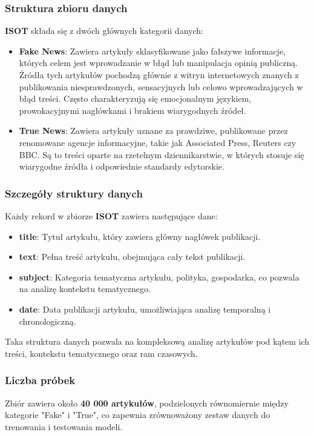 \subsubsection{Struktura zbioru danych}
\textbf{ISOT} składa się z dwóch głównych kategorii danych:
\begin{itemize}
	\item \textbf{Fake News}: Zawiera artykuły sklasyfikowane jako fałszywe informacje, których celem jest wprowadzanie w błąd lub manipulacja opinią publiczną. Źródła tych artykułów pochodzą głównie z witryn internetowych znanych z publikowania niesprawdzonych, sensacyjnych lub celowo wprowadzających w błąd treści. Często charakteryzują się emocjonalnym językiem, prowokacyjnymi nagłówkami i brakiem wiarygodnych źródeł.
	\item \textbf{True News}: Zawiera artykuły uznane za prawdziwe, publikowane przez renomowane agencje informacyjne, takie jak Associated Press, Reuters czy BBC. Są to treści oparte na rzetelnym dziennikarstwie, w których stosuje się wiarygodne źródła i odpowiednie standardy edytorskie.
\end{itemize}

\subsubsection{Szczegóły struktury danych}
Każdy rekord w zbiorze \textbf{ISOT} zawiera następujące dane:
\begin{itemize}
	\item \textbf{title}: Tytuł artykułu, który zawiera główny nagłówek publikacji.
	\item \textbf{text}: Pełna treść artykułu, obejmująca cały tekst publikacji.
	\item \textbf{subject}: Kategoria tematyczna artykułu, polityka, gospodarka, co pozwala na analizę kontekstu tematycznego.
	\item \textbf{date}: Data publikacji artykułu, umożliwiająca analizę temporalną i chronologiczną.
\end{itemize}
Taka struktura danych pozwala na kompleksową analizę artykułów pod kątem ich treści, kontekstu tematycznego oraz ram czasowych.

\subsubsection{Liczba próbek}
Zbiór zawiera około \textbf{40 000 artykułów}, podzielonych równomiernie między kategorie "Fake" i "True", co zapewnia zrównoważony zestaw danych do trenowania i testowania modeli.

